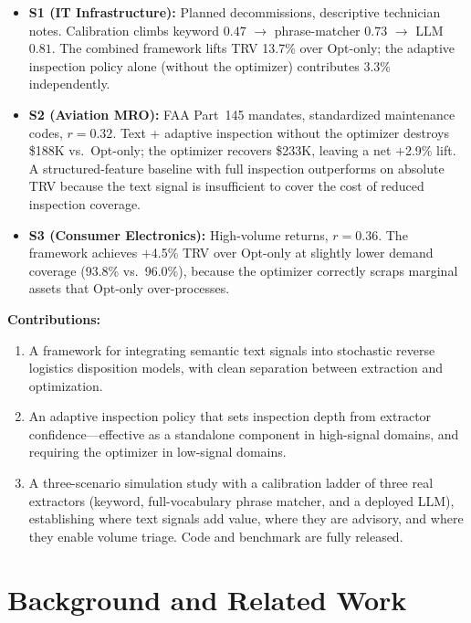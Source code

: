 \documentclass[conference]{IEEEtran}
\begin{document}
\begin{itemize}[leftmargin=*,noitemsep]
\item \textbf{S1 (IT Infrastructure):} Planned decommissions, descriptive
  technician notes. Calibration climbs keyword $0.47$ $\rightarrow$ phrase-matcher
  $0.73$ $\rightarrow$ LLM $0.81$. The combined framework lifts TRV 13.7\% over
  Opt-only; the adaptive inspection policy alone (without the optimizer)
  contributes 3.3\% independently.

\item \textbf{S2 (Aviation MRO):} FAA Part~145 mandates, standardized
  maintenance codes, $r{=}0.32$. Text + adaptive inspection without the optimizer
  destroys \$188K vs.\ Opt-only; the optimizer recovers \$233K, leaving a net
  $+$2.9\% lift. A structured-feature baseline with full inspection outperforms on
  absolute TRV because the text signal is insufficient to cover the cost of
  reduced inspection coverage.

\item \textbf{S3 (Consumer Electronics):} High-volume returns, $r{=}0.36$. The
  framework achieves $+$4.5\% TRV over Opt-only at slightly lower demand coverage
  (93.8\% vs.\ 96.0\%), because the optimizer correctly scraps marginal assets
  that Opt-only over-processes.
\end{itemize}

\smallskip\noindent\textbf{Contributions:}
\begin{enumerate}[noitemsep]
\item A framework for integrating semantic text signals into stochastic reverse
  logistics disposition models, with clean separation between extraction and
  optimization.
\item An adaptive inspection policy that sets inspection depth from extractor
  confidence---effective as a standalone component in high-signal domains,
  and requiring the optimizer in low-signal domains.
\item A three-scenario simulation study with a calibration ladder of three real
  extractors (keyword, full-vocabulary phrase matcher, and a deployed LLM),
  establishing where text signals add value, where they are advisory, and where
  they enable volume triage. Code and benchmark are fully released.
\end{enumerate}

\section{Background and Related Work}
\end{document}
